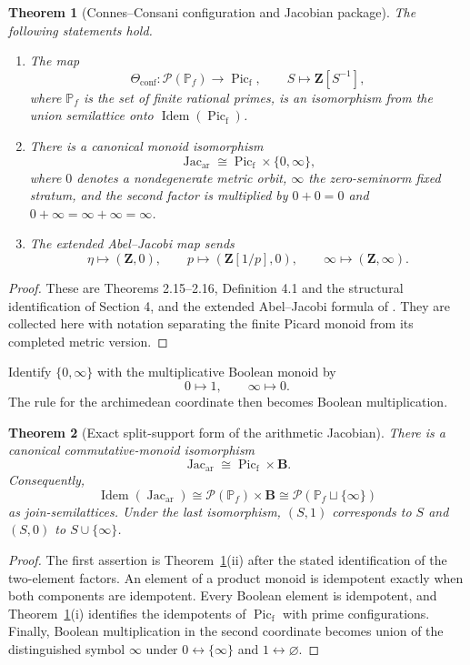 \documentclass[11pt]{amsart}
\numberwithin{equation}{section}
\newtheorem{theorem}{Theorem}[section]
\theoremstyle{definition}
\newcommand{\B}{\mathbf B}
\newcommand{\Z}{\mathbf Z}
\newcommand{\Picf}{\operatorname{Pic}_{\mathrm f}}
\newcommand{\Jacar}{\operatorname{Jac}_{\mathrm{ar}}}
\newcommand{\Idem}{\operatorname{Idem}}
\begin{document}
\begin{theorem}[Connes--Consani configuration and Jacobian package]
\label{thm:cc-jacobian-package}
The following statements hold.
\begin{enumerate}[label=\textup{(\roman*)}]
\item The map
\[
\Theta_{\mathrm{conf}}:\mathcal P(\mathbb P_f)\longrightarrow\Picf,
\qquad
S\longmapsto\Z[S^{-1}],
\]
where $\mathbb P_f$ is the set of finite rational primes, is an isomorphism
from the union semilattice onto $\Idem(\Picf)$.
\item There is a canonical monoid isomorphism
\[
\Jacar\cong\Picf\times\{0,\infty\},
\]
where $0$ denotes a nondegenerate metric orbit, $\infty$ the zero-seminorm
fixed stratum, and the second factor is multiplied by
$0+0=0$ and $0+\infty=\infty+\infty=\infty$.
\item The extended Abel--Jacobi map sends
\[
\eta\longmapsto(\Z,0),
\qquad
p\longmapsto(\Z[1/p],0),
\qquad
\infty\longmapsto(\Z,\infty).
\]
\end{enumerate}
\end{theorem}

\begin{proof}
These are Theorems 2.15--2.16, Definition 4.1 and the structural
identification of Section 4, and the extended Abel--Jacobi formula of
\cite{CCJacobian}.  They are collected here with notation separating the
finite Picard monoid from its completed metric version.
\end{proof}

Identify $\{0,\infty\}$ with the multiplicative Boolean monoid by
\[
0\longmapsto1,
\qquad
\infty\longmapsto0.
\]
The rule for the archimedean coordinate then becomes Boolean
multiplication.

\begin{theorem}[Exact split-support form of the arithmetic Jacobian]
\label{thm:jacobian-boolean-product}
There is a canonical commutative-monoid isomorphism
\[
\boxed{\Jacar\cong\Picf\times\B.}
\]
Consequently,
\[
\boxed{
\Idem(\Jacar)
\cong
\mathcal P(\mathbb P_f)\times\B
\cong
\mathcal P(\mathbb P_f\sqcup\{\infty\})
}
\]
as join-semilattices.  Under the last isomorphism,
$(S,1)$ corresponds to $S$ and $(S,0)$ to $S\cup\{\infty\}$.
\end{theorem}

\begin{proof}
The first assertion is Theorem~\ref{thm:cc-jacobian-package}(ii) after the
stated identification of the two-element factors.  An element of a product
monoid is idempotent exactly when both components are idempotent.  Every
Boolean element is idempotent, and
Theorem~\ref{thm:cc-jacobian-package}(i) identifies the idempotents of
$\Picf$ with prime configurations.  Finally, Boolean multiplication in the
second coordinate becomes union of the distinguished symbol $\infty$ under
$0\leftrightarrow\{\infty\}$ and $1\leftrightarrow\varnothing$.
\end{proof}
\end{document}
